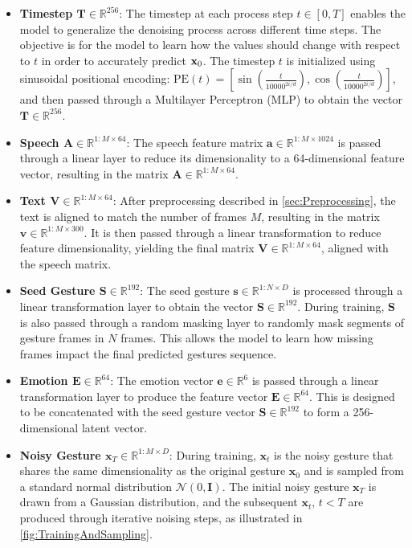 \begin{itemize}
	\item \textbf{Timestep $\mathbf{T} \in \mathbb{R}^{256}$}: The timestep at each process step $t \in [0, T]$ enables the model to generalize the denoising process across different time steps. The objective is for the model to learn how the values should change with respect to $t$ in order to accurately predict $\mathbf{x}_0$. The timestep $t$ is initialized using sinusoidal positional encoding: $\text{PE}(t) = \left[ \sin{\left(\frac{t}{10000^{2i / d}}\right)}, \cos{\left(\frac{t}{10000^{2i / d}}\right)} \right]$, and then passed through a Multilayer Perceptron (MLP) to obtain the vector $\mathbf{T} \in \mathbb{R}^{256}$.
	
	\item \textbf{Speech $\mathbf{A} \in \mathbb{R}^{1:M \times 64}$}: The speech feature matrix $\mathbf{a} \in \mathbb{R}^{1:M \times 1024}$ is passed through a linear layer to reduce its dimensionality to a 64-dimensional feature vector, resulting in the matrix $\mathbf{A} \in \mathbb{R}^{1:M \times 64}$.
	
	\item \textbf{Text $\mathbf{V} \in \mathbb{R}^{1:M \times 64}$}: After preprocessing described in \autoref{sec:Preprocessing}, the text is aligned to match the number of frames $M$, resulting in the matrix $\mathbf{v} \in \mathbb{R}^{1:M \times 300}$. It is then passed through a linear transformation to reduce feature dimensionality, yielding the final matrix $\mathbf{V} \in \mathbb{R}^{1:M \times 64}$, aligned with the speech matrix.
	
	\item \textbf{Seed Gesture $\mathbf{S} \in \mathbb{R}^{192}$}: The seed gesture $\mathbf{s} \in \mathbb{R}^{1:N \times D}$ is processed through a linear transformation layer to obtain the vector $\mathbf{S} \in \mathbb{R}^{192}$. During training, $\mathbf{S}$ is also passed through a random masking layer to randomly mask segments of gesture frames in $N$ frames. This allows the model to learn how missing frames impact the final predicted gestures sequence.
	
	\item \textbf{Emotion $\mathbf{E} \in \mathbb{R}^{64}$}: The emotion vector $\mathbf{e} \in \mathbb{R}^{6}$ is passed through a linear transformation layer to produce the feature vector $\mathbf{E} \in \mathbb{R}^{64}$. This is designed to be concatenated with the seed gesture vector $\mathbf{S} \in \mathbb{R}^{192}$ to form a 256-dimensional latent vector.
	
	\item \textbf{Noisy Gesture $\mathbf{x}_{T} \in \mathbb{R}^{1:M \times D}$}: During training, $\mathbf{x}_t$ is the noisy gesture that shares the same dimensionality as the original gesture $\mathbf{x}_0$ and is sampled from a standard normal distribution $\mathcal{N}(0, \mathbf{I})$. The initial noisy gesture $\mathbf{x}_T$ is drawn from a Gaussian distribution, and the subsequent $\mathbf{x}_t, \, t < T$ are produced through iterative noising steps, as illustrated in \autoref{fig:TrainingAndSampling}.
\end{itemize}


